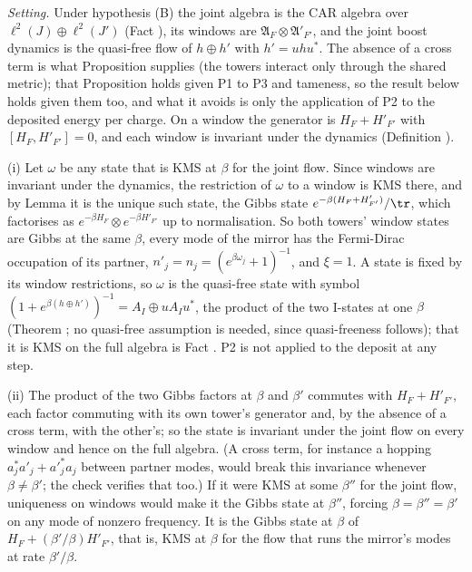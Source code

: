 \emph{Setting.} Under hypothesis (B) the joint algebra is the CAR algebra over $\ell^{2}(J) \oplus \ell^{2}(J')$ (Fact ), its windows are $\mathfrak{A}_{F} \otimes \mathfrak{A}'_{F'}$, and the joint boost dynamics is the quasi-free flow of $h \oplus h'$ with $h' = u h u^{*}$. The absence of a cross term is what Proposition  supplies (the towers interact only through the shared metric); that Proposition holds given P1 to P3 and tameness, so the result below holds given them too, and what it avoids is only the application of P2 to the deposited energy per charge. On a window the generator is $H_{F} + H'_{F'}$ with $[H_{F}, H'_{F'}] = 0$, and each window is invariant under the dynamics (Definition ).

(i) Let $\omega$ be any state that is KMS at $\beta$ for the joint flow. Since windows are invariant under the dynamics, the restriction of $\omega$ to a window is KMS there, and by Lemma  it is the unique such state, the Gibbs state $e^{-\beta(H_{F} + H'_{F'})}/\tr$, which factorises as $e^{-\beta H_{F}} \otimes e^{-\beta H'_{F'}}$ up to normalisation. So both towers' window states are Gibbs at the same $\beta$, every mode of the mirror has the Fermi-Dirac occupation of its partner, $n'_{j} = n_{j} = (e^{\beta\omega_{j}} + 1)^{-1}$, and $\xi = 1$. A state is fixed by its window restrictions, so $\omega$ is the quasi-free state with symbol $(1 + e^{\beta(h \oplus h')})^{-1} = A_{I} \oplus u A_{I} u^{*}$, the product of the two I-states at one $\beta$ (Theorem ; no quasi-free assumption is needed, since quasi-freeness follows); that it is KMS on the full algebra is Fact . P2 is not applied to the deposit at any step.

(ii) The product of the two Gibbs factors at $\beta$ and $\beta'$ commutes with $H_{F} + H'_{F'}$, each factor commuting with its own tower's generator and, by the absence of a cross term, with the other's; so the state is invariant under the joint flow on every window and hence on the full algebra. (A cross term, for instance a hopping $a^{*}_{j}a'_{j} + a'^{*}_{j}a_{j}$ between partner modes, would break this invariance whenever $\beta \neq \beta'$; the check verifies that too.) If it were KMS at some $\beta''$ for the joint flow, uniqueness on windows would make it the Gibbs state at $\beta''$, forcing $\beta = \beta'' = \beta'$ on any mode of nonzero frequency. It is the Gibbs state at $\beta$ of $H_{F} + (\beta'/\beta)H'_{F'}$, that is, KMS at $\beta$ for the flow that runs the mirror's modes at rate $\beta'/\beta$.

